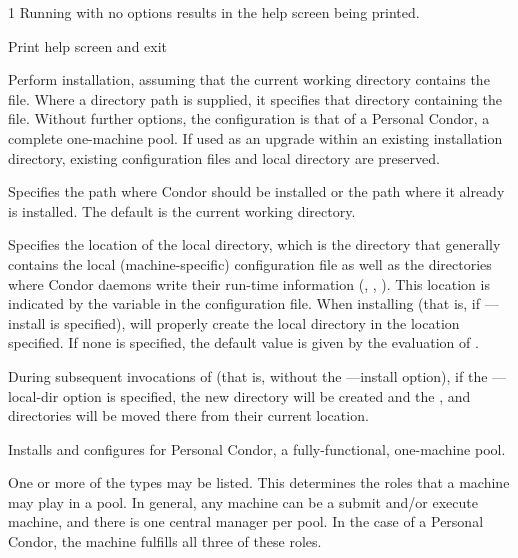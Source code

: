 \begin{ManPage}{\label{man-condor-configure}}{1}
Running  with no options results in the
help screen being printed.

\begin{Options}
	 {Print help screen and exit}

	 {Perform installation, assuming that
	the current working directory contains the  file.
	Where a directory path is supplied,
	it specifies that directory containing the  file.
	Without further options, the configuration is that of
	a Personal Condor, a complete one-machine pool.
	If used as an 
	upgrade within an existing installation directory, existing 
	configuration files and local directory are preserved.}

	 {Specifies the path
	where Condor should be installed or the path where it already is
	installed. The default is the current working directory.}

	 {Specifies the
	location of the local directory, which is the directory that generally 
	contains the local (machine-specific) configuration file as well as the
	directories where Condor daemons write their run-time information 
	(, , ).
	This location is indicated  by the  
	variable in the configuration file. 
	When installing (that is, if ---install is specified),
	will properly create the local directory in the location specified.
	If none is specified, the default value is given by the evaluation of
        .

	During subsequent invocations of 
	(that is, without the ---install option),
	if the ---local-dir option is specified, the new directory
	will be created and the ,  and  
	directories will be moved there from their current location.}

	 {Installs and configures for 
	 Personal Condor, a fully-functional, one-machine pool.}

	 {One
	or more of the types may be listed.
	This determines the roles that a machine may play in a pool.
	In general, any machine can be a submit and/or execute machine,
	and there is one central manager per pool.
	In the case of a Personal Condor,
	the machine fulfills all three of these roles.}


\end{Options}
\end{ManPage}
